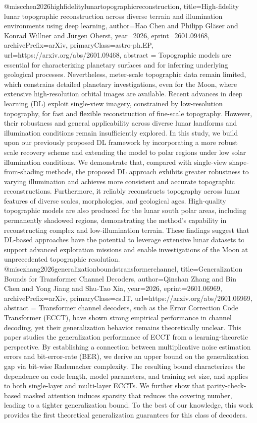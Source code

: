 {}@misc{chen2026highfidelitylunartopographicreconstruction,
      title={High-fidelity lunar topographic reconstruction across diverse terrain and illumination environments using deep learning}, 
      author={Hao Chen and Philipp Gläser and Konrad Willner and Jürgen Oberst},
      year={2026},
      eprint={2601.09468},
      archivePrefix={arXiv},
      primaryClass={astro-ph.EP},
      url={https://arxiv.org/abs/2601.09468},
      abstract = {Topographic models are essential for characterizing planetary surfaces and for inferring underlying geological processes. Nevertheless, meter-scale topographic data remain limited, which constrains detailed planetary investigations, even for the Moon, where extensive high-resolution orbital images are available. Recent advances in deep learning (DL) exploit single-view imagery, constrained by low-resolution topography, for fast and flexible reconstruction of fine-scale topography. However, their robustness and general applicability across diverse lunar landforms and illumination conditions remain insufficiently explored. In this study, we build upon our previously proposed DL framework by incorporating a more robust scale recovery scheme and extending the model to polar regions under low solar illumination conditions. We demonstrate that, compared with single-view shape-from-shading methods, the proposed DL approach exhibits greater robustness to varying illumination and achieves more consistent and accurate topographic reconstructions. Furthermore, it reliably reconstructs topography across lunar features of diverse scales, morphologies, and geological ages. High-quality topographic models are also produced for the lunar south polar areas, including permanently shadowed regions, demonstrating the method's capability in reconstructing complex and low-illumination terrain. These findings suggest that DL-based approaches have the potential to leverage extensive lunar datasets to support advanced exploration missions and enable investigations of the Moon at unprecedented topographic resolution.}
}@misc{zhang2026generalizationboundstransformerchannel,
      title={Generalization Bounds for Transformer Channel Decoders}, 
      author={Qinshan Zhang and Bin Chen and Yong Jiang and Shu-Tao Xia},
      year={2026},
      eprint={2601.06969},
      archivePrefix={arXiv},
      primaryClass={cs.IT},
      url={https://arxiv.org/abs/2601.06969},
      abstract = {Transformer channel decoders, such as the Error Correction Code Transformer (ECCT), have shown strong empirical performance in channel decoding, yet their generalization behavior remains theoretically unclear. This paper studies the generalization performance of ECCT from a learning-theoretic perspective. By establishing a connection between multiplicative noise estimation errors and bit-error-rate (BER), we derive an upper bound on the generalization gap via bit-wise Rademacher complexity. The resulting bound characterizes the dependence on code length, model parameters, and training set size, and applies to both single-layer and multi-layer ECCTs. We further show that parity-check-based masked attention induces sparsity that reduces the covering number, leading to a tighter generalization bound. To the best of our knowledge, this work provides the first theoretical generalization guarantees for this class of decoders.}
}
